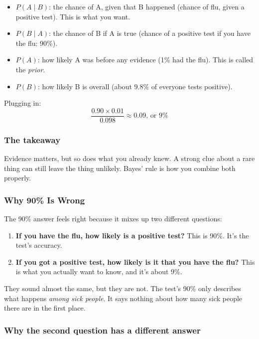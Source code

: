 \begin{itemize}
  \item $P(A \mid B)$: the chance of A, given that B happened (chance of flu, given a positive test). This is what you want.
  \item $P(B \mid A)$: the chance of B if A is true (chance of a positive test if you have the flu: 90\%).
  \item $P(A)$: how likely A was before any evidence (1\% had the flu). This is called the \emph{prior}.
  \item $P(B)$: how likely B is overall (about 9.8\% of everyone tests positive).
\end{itemize}

Plugging in:
\[
\frac{0.90 \times 0.01}{0.098} \approx 0.09 \text{, or } 9\%
\]

\subsubsection*{The takeaway}

Evidence matters, but so does what you already knew. A strong clue about a rare thing can still leave the thing unlikely. Bayes' rule is how you combine both properly.

\subsubsection*{Why 90\% Is Wrong}

The 90\% answer feels right because it mixes up two different questions:

\begin{enumerate}
  \item \textbf{If you have the flu, how likely is a positive test?} This is 90\%. It's the test's accuracy.
  \item \textbf{If you got a positive test, how likely is it that you have the flu?} This is what you actually want to know, and it's about 9\%.
\end{enumerate}

They sound almost the same, but they are not. The test's 90\% only describes what happens \emph{among sick people}. It says nothing about how many sick people there are in the first place.

\subsubsection*{Why the second question has a different answer}

